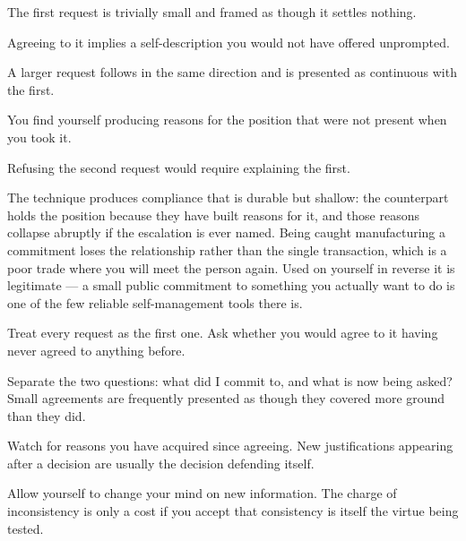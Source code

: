 \begin{feedback}
  \item The first request is trivially small and framed as though it settles nothing.
  \item Agreeing to it implies a self-description you would not have offered unprompted.
  \item A larger request follows in the same direction and is presented as continuous with the first.
  \item You find yourself producing reasons for the position that were not present when you took it.
  \item Refusing the second request would require explaining the first.
\end{feedback}

\begin{failure}
The technique produces compliance that is durable but shallow: the counterpart holds the position because they have built reasons for it, and those reasons collapse abruptly if the escalation is ever named. Being caught manufacturing a commitment loses the relationship rather than the single transaction, which is a poor trade where you will meet the person again. Used on yourself in reverse it is legitimate --- a small public commitment to something you actually want to do is one of the few reliable self-management tools there is.
\end{failure}

\begin{countermeasures}
  \item Treat every request as the first one. Ask whether you would agree to it having never agreed to anything before.
  \item Separate the two questions: what did I commit to, and what is now being asked? Small agreements are frequently presented as though they covered more ground than they did.
  \item Watch for reasons you have acquired since agreeing. New justifications appearing after a decision are usually the decision defending itself.
  \item Allow yourself to change your mind on new information. The charge of inconsistency is only a cost if you accept that consistency is itself the virtue being tested.
\end{countermeasures}

\seesources
{}
